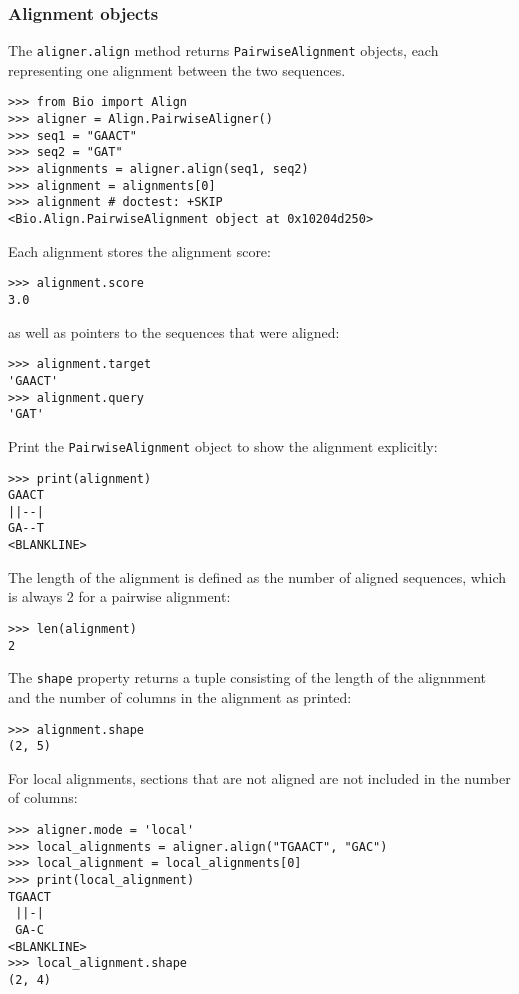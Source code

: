 \subsubsection{Alignment objects}
The \verb+aligner.align+ method returns \verb+PairwiseAlignment+ objects, each representing one alignment between the two sequences.

\begin{verbatim}
>>> from Bio import Align
>>> aligner = Align.PairwiseAligner()
>>> seq1 = "GAACT"
>>> seq2 = "GAT"
>>> alignments = aligner.align(seq1, seq2)
>>> alignment = alignments[0]
>>> alignment # doctest: +SKIP
<Bio.Align.PairwiseAlignment object at 0x10204d250>
\end{verbatim}

Each alignment stores the alignment score:

\begin{verbatim}
>>> alignment.score
3.0
\end{verbatim}
as well as pointers to the sequences that were aligned:

\begin{verbatim}
>>> alignment.target
'GAACT'
>>> alignment.query
'GAT'
\end{verbatim}

Print the \verb+PairwiseAlignment+ object to show the alignment explicitly:

\begin{verbatim}
>>> print(alignment)
GAACT
||--|
GA--T
<BLANKLINE>
\end{verbatim}

The length of the alignment is defined as the number of aligned sequences,
which is always 2 for a pairwise alignment:

\begin{verbatim}
>>> len(alignment)
2
\end{verbatim}

The \verb+shape+ property returns a tuple consisting of the length of the
alignnment and the number of columns in the alignment as printed:

\begin{verbatim}
>>> alignment.shape
(2, 5)
\end{verbatim}

For local alignments, sections that are not aligned are not included in the number of columns:
\begin{verbatim}
>>> aligner.mode = 'local'
>>> local_alignments = aligner.align("TGAACT", "GAC")
>>> local_alignment = local_alignments[0]
>>> print(local_alignment)
TGAACT
 ||-|
 GA-C
<BLANKLINE>
>>> local_alignment.shape
(2, 4)
\end{verbatim}

